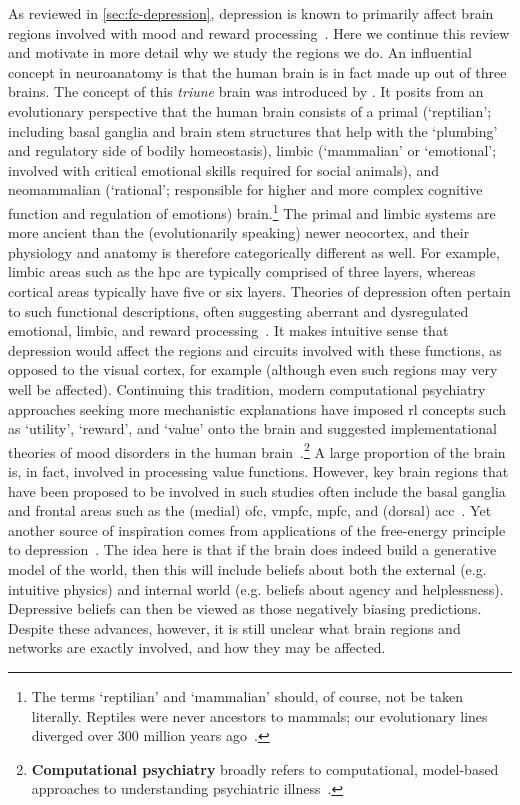 As reviewed in \cref{sec:fc-depression}, depression is known to primarily affect brain regions involved with mood and reward processing~\parencite{Pandya2012}.
Here we continue this review and motivate in more detail why we study the regions we do.
%
An influential concept in neuroanatomy is that the human brain is in fact made up out of three brains.
The concept of this \emph{triune} brain was introduced by \textcite{Maclean1985}.
It posits from an evolutionary perspective that the human brain consists of a primal (`reptilian'; including basal ganglia and brain stem structures that help with the `plumbing' and regulatory side of bodily homeostasis), limbic (`mammalian' or `emotional'; involved with critical emotional skills required for social animals), and neomammalian (`rational'; responsible for higher and more complex cognitive function and regulation of emotions) brain.\footnote{The terms `reptilian' and `mammalian' should, of course, not be taken literally. Reptiles were never ancestors to mammals; our evolutionary lines diverged over 300 million years ago~\parencite{Striedter2019}.}
The primal and limbic systems are more ancient than the (evolutionarily speaking) newer neocortex, and their physiology and anatomy is therefore categorically different as well.
For example, limbic areas such as the \gls{hpc} are typically comprised of three layers, whereas cortical areas typically have five or six layers.
Theories of depression often pertain to such functional descriptions, often suggesting aberrant and dysregulated emotional, limbic, and reward processing~\parencite{Akiskal1973}.
It makes intuitive sense that depression would affect the regions and circuits involved with these functions, as opposed to the visual cortex, for example (although even such regions may very well be affected).
Continuing this tradition, modern computational psychiatry approaches seeking more mechanistic explanations have imposed \gls{rl} concepts such as `utility', `reward', and `value' onto the brain and suggested implementational theories of mood disorders in the human brain~\parencite{Huys2013, Chen2015, Eldar2016, Juechems2019, Bennett2020, Bennett2021}.\footnote{\textbf{Computational psychiatry} broadly refers to computational, model-based approaches to understanding psychiatric illness~\parencite{Montague2012, Adams2016, Radulescu2019, Huys2021}.}
A large proportion of the brain is, in fact, involved in processing value functions.
However, key brain regions that have been proposed to be involved in such studies often include the basal ganglia and frontal areas such as the (medial) \gls{ofc}, \gls{vmpfc}, \gls{mpfc}, and (dorsal) \gls{acc}~\parencite{Lee2012}.
Yet another source of inspiration comes from applications of the free-energy principle to depression~\parencite{Chekroud2015}.
The idea here is that if the brain does indeed build a generative model of the world, then this will include beliefs about both the external (e.g. intuitive physics) and internal world (e.g. beliefs about agency and helplessness).
Depressive beliefs can then be viewed as those negatively biasing predictions.
Despite these advances, however, it is still unclear what brain regions and networks are exactly involved, and how they may be affected.

